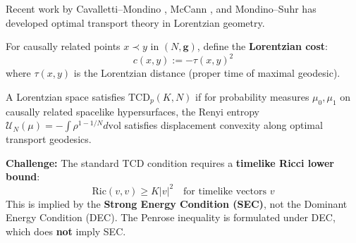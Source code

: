 Recent work by Cavalletti--Mondino \cite{cavallettimondino2020}, McCann \cite{mccann2020}, and Mondino--Suhr \cite{mondinosuhr2022} has developed optimal transport theory in Lorentzian geometry.

\begin{definition}\label{def:LorentzianCost}
For causally related points $x \prec y$ in $(N, \mathbf{g})$, define the \textbf{Lorentzian cost}:
\begin{equation}
    c(x,y) := -\tau(x,y)^2
\end{equation}
where $\tau(x,y)$ is the Lorentzian distance (proper time of maximal geodesic).
\end{definition}

\begin{definition}\label{def:TCD}
A Lorentzian space satisfies $\mathrm{TCD}_p(K, N)$ if for probability measures $\mu_0, \mu_1$ on causally related spacelike hypersurfaces, the Renyi entropy $\mathcal{U}_N(\mu) = -\int \rho^{1-1/N} d\text{vol}$ satisfies displacement convexity along optimal transport geodesics.
\end{definition}

\begin{remark}\label{rem:EnergyConditionGap}
\textbf{Challenge:} The standard TCD condition requires a \textbf{timelike Ricci lower bound}:
\begin{equation}
    \mathrm{Ric}(v, v) \geq K|v|^2 \quad \text{for timelike vectors } v
\end{equation}
This is implied by the \textbf{Strong Energy Condition (SEC)}, not the Dominant Energy Condition (DEC). The Penrose inequality is formulated under DEC, which does \textbf{not} imply SEC.
\end{remark}

